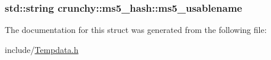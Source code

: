 \subsubsection[{ms5\+\_\+usablename}]{\setlength{\rightskip}{0pt plus 5cm}std\+::string crunchy\+::ms5\+\_\+hash\+::ms5\+\_\+usablename}\label{structcrunchy_1_1ms5__hash_a375a1251bbe67bb9928f1b4154154ef0}


The documentation for this struct was generated from the following file\+:\begin{DoxyCompactItemize}
\item 
include/\hyperlink{_tempdata_8h}{Tempdata.\+h}\end{DoxyCompactItemize}
